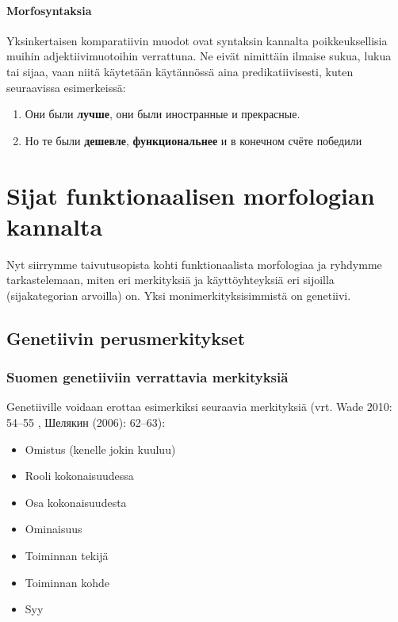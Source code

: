 \documentclass[]{scrreprt}
\providecommand{\tightlist}{%
  \setlength{\itemsep}{0pt}\setlength{\parskip}{0pt}}
\begin{document}
\subsubsection{Morfosyntaksia}\label{morfosyntaksia}

Yksinkertaisen komparatiivin muodot ovat syntaksin kannalta
poikkeuksellisia muihin adjektiivimuotoihin verrattuna. Ne eivät
nimittäin ilmaise sukua, lukua tai sijaa, vaan niitä käytetään
käytännössä aina predikatiivisesti, kuten seuraavissa esimerkeissä:

\begin{enumerate}
\def\labelenumi{(\arabic{enumi})}
\setcounter{enumi}{21}
\tightlist
\item
  Они были \textbf{лучше}, они были иностранные и прекрасные.
\item
  Но те были \textbf{дешевле}, \textbf{функциональнее} и в конечном
  счёте победили
\end{enumerate}

\chapter{Sijat funktionaalisen morfologian
kannalta}\label{luento-7-sijat-funktionaalisen-morfologian-kannalta}


Nyt siirrymme taivutusopista kohti funktionaalista morfologiaa ja
ryhdymme tarkastelemaan, miten eri merkityksiä ja käyttöyhteyksiä eri
sijoilla (sijakategorian arvoilla) on. Yksi monimerkityksisimmistä on
genetiivi.

\section{Genetiivin
perusmerkitykset}\label{genetiivin-perusmerkitykset}

\subsection{Suomen genetiiviin verrattavia
merkityksiä}\label{suomen-genetiiviin-verrattavia-merkityksiuxe4}

Genetiiville voidaan erottaa esimerkiksi seuraavia merkityksiä (vrt.
Wade 2010: 54--55 , Шелякин (2006): 62--63):

\begin{itemize}
\tightlist
\item
  Omistus (kenelle jokin kuuluu)
\item
  Rooli kokonaisuudessa
\item
  Osa kokonaisuudesta
\item
  Ominaisuus
\item
  Toiminnan tekijä
\item
  Toiminnan kohde
\item
  Syy
\end{itemize}
\end{document}
